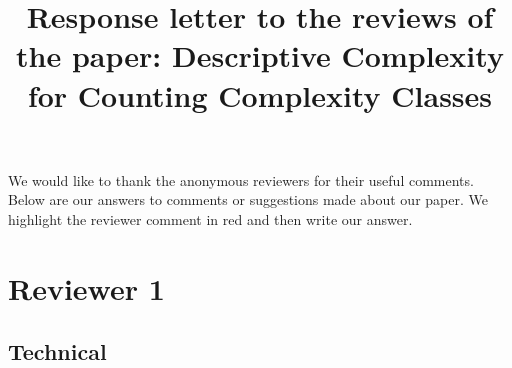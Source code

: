 \documentclass[a4paper]{article}
\begin{document}
\title{Response letter to the reviews of the paper: Descriptive Complexity for Counting Complexity Classes}

\maketitle

We would like to thank the anonymous reviewers for their useful comments.
Below are our answers to comments or suggestions made about our paper.
We highlight the reviewer comment in red and then write our answer.

\section*{Reviewer 1}

\subsection*{Technical}
\end{document}
